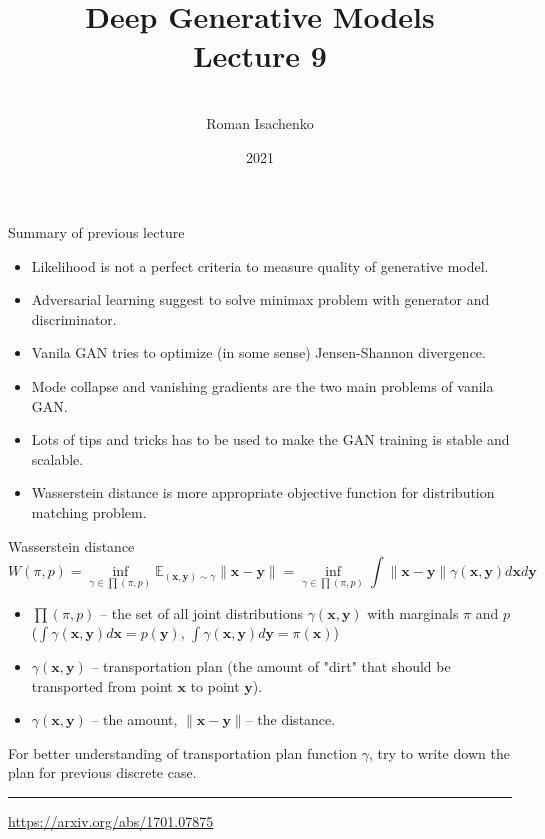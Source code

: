 \documentclass{beamer}
\title[\hbox to 56mm{Deep Generative Models  \hfill\insertframenumber\,/\,\inserttotalframenumber}]
{Deep Generative Models \\ Lecture 9}
\author[Roman Isachenko]{\\Roman Isachenko}
\institute[Ozon]{Ozon Masters \\
}
\date{2021}
\newcommand{\bx}{\mathbf{x}}
\newcommand{\by}{\mathbf{y}}
\newcommand{\bbE}{\mathbb{E}}
\begin{document}
\begin{frame}
\titlepage
\end{frame}
\begin{frame}{Summary of previous lecture}
\begin{itemize}
	\item Likelihood is not a perfect criteria to measure quality of generative model.
	\item Adversarial learning suggest to solve minimax problem with generator and discriminator.
	\item Vanila GAN tries to optimize (in some sense) Jensen-Shannon divergence.
	\item Mode collapse and vanishing gradients are the two main problems of vanila GAN.
	\item Lots of tips and tricks has to be used to make the GAN training is stable and scalable.
	\item Wasserstein distance is more appropriate objective function for distribution matching problem.
\end{itemize}
\end{frame}
\begin{frame}{Wasserstein distance}
	\[
	W(\pi, p) = \inf_{\gamma \in \prod(\pi, p)} \bbE_{(\bx, \by) \sim \gamma} \| \bx - \by \| =  \inf_{\gamma \in \prod(\pi, p)} \int \| \bx - \by \| \gamma (\bx, \by) d \bx d \by
	\]
	\begin{itemize}
		\item $\prod(\pi, p)$ -- the set of all joint distributions $\gamma (\bx, \by)$ with marginals $\pi$ and $p$ ($\int \gamma(\bx, \by) d \bx = p(\by)$, $\int \gamma(\bx, \by) d \by = \pi(\bx)$)
		\item $\gamma(\bx, \by)$ -- transportation plan (the amount of "dirt" that should be transported from point $\bx$ to point $\by$).
		\item $\gamma(\bx, \by)$ -- the amount, $\|\bx - \by \|$-- the distance.
	\end{itemize}
	For better understanding of transportation plan function $\gamma$, try to write down the plan for previous discrete case.
	\vfill
	\hrule\medskip 
	{\scriptsize \href{https://arxiv.org/abs/1701.07875}{https://arxiv.org/abs/1701.07875}}
\end{frame}
\end{document}
